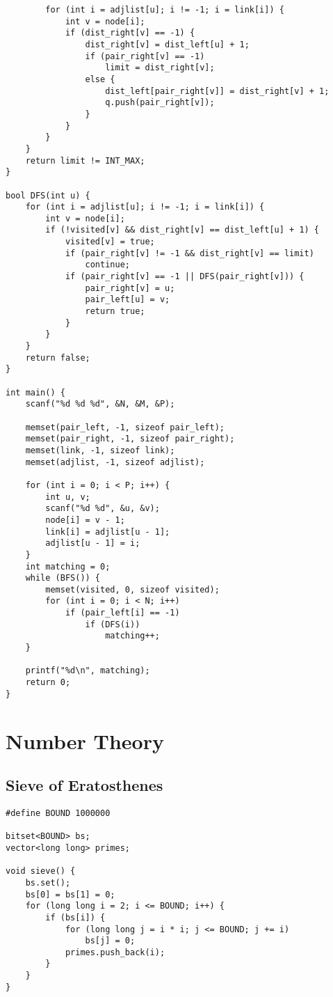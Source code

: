 \documentclass[10pt,landscape]{article}
\begin{document}
\begin{multicols}{2}
\begin{lstlisting}
        for (int i = adjlist[u]; i != -1; i = link[i]) {
            int v = node[i];
            if (dist_right[v] == -1) {
                dist_right[v] = dist_left[u] + 1;
                if (pair_right[v] == -1)
                    limit = dist_right[v];
                else {
                    dist_left[pair_right[v]] = dist_right[v] + 1;
                    q.push(pair_right[v]);
                }
            }
        }
    }
    return limit != INT_MAX;
}
 
bool DFS(int u) {
    for (int i = adjlist[u]; i != -1; i = link[i]) {
        int v = node[i];
        if (!visited[v] && dist_right[v] == dist_left[u] + 1) {
            visited[v] = true;
            if (pair_right[v] != -1 && dist_right[v] == limit)
                continue;
            if (pair_right[v] == -1 || DFS(pair_right[v])) {
                pair_right[v] = u;
                pair_left[u] = v;
                return true;
            }
        }
    }
    return false;
}
 
int main() {
    scanf("%d %d %d", &N, &M, &P);

    memset(pair_left, -1, sizeof pair_left);
    memset(pair_right, -1, sizeof pair_right);
    memset(link, -1, sizeof link);
    memset(adjlist, -1, sizeof adjlist);
 
    for (int i = 0; i < P; i++) {
        int u, v;
        scanf("%d %d", &u, &v);
        node[i] = v - 1;
        link[i] = adjlist[u - 1];
        adjlist[u - 1] = i;
    }
    int matching = 0;
    while (BFS()) {
        memset(visited, 0, sizeof visited);
        for (int i = 0; i < N; i++)
            if (pair_left[i] == -1)
                if (DFS(i))
                    matching++;
    }
 
    printf("%d\n", matching);
    return 0;
}
\end{lstlisting}

\section{Number Theory}
\subsection{Sieve of Eratosthenes}
\begin{lstlisting}
#define BOUND 1000000

bitset<BOUND> bs;
vector<long long> primes;

void sieve() {
    bs.set();
    bs[0] = bs[1] = 0;
    for (long long i = 2; i <= BOUND; i++) {
        if (bs[i]) {
            for (long long j = i * i; j <= BOUND; j += i)
                bs[j] = 0;
            primes.push_back(i);
        }
    }
}


\end{lstlisting}
\end{multicols}
\end{document}
